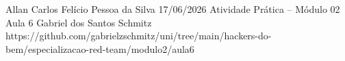 \documentclass{article}
\begin{document}
{Allan Carlos Felício Pessoa da Silva}
{17/06/2026}
{Atividade Prática -- Módulo 02}
{Aula 6}
{Gabriel dos Santos Schmitz}
{https://github.com/gabrielzschmitz/uni/tree/main/hackers-do-bem/especializacao-red-team/modulo2/aula6}





\newpage
\printbibliography[title=Referências]
\end{document}
